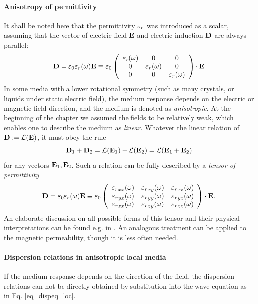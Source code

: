 \paragraph{Anisotropy of permittivity} \label{par_anisotropy} %
It shall be noted here that the permittivity $\varepsilon_r$ was introduced as a scalar, assuming that the vector of electric field $\mathbf{E}$ and electric induction $\mathbf{D}$ are always parallel:
\begin{equation} \mathbf{D} = \varepsilon_0 \varepsilon_r(\omega) \mathbf{E} \equiv \varepsilon_0  
	\left(\begin{array}{ccc} 
			\varepsilon_r(\omega) & 0 & 0  \\
			0 & \varepsilon_r(\omega) & 0  \\
			0 & 0 &\varepsilon_r(\omega)  
	\end{array} \right) \cdot \mathbf{E}
	\label{eq_ed_orientation}
\end{equation}
In some media with a lower rotational symmetry (such as many crystals, or liquids under static electric field), the medium response depends on the electric or magnetic field direction, and the medium is denoted as \textit{anisotropic}. At the beginning of the chapter we assumed the fields to be relatively weak, which enables one to describe the medium as \textit{linear}. Whatever the linear relation of $\mathbf{D} := \mathcal{L}(\mathbf{E})$, it must obey the rule
$$\mathbf{D}_1 + \mathbf{D}_2 = \mathcal{L}(\mathbf{E}_1) + \mathcal{L}(\mathbf{E}_2) = \mathcal{L}(\mathbf{E}_1 + \mathbf{E}_2)$$
for any vectors $\mathbf{E}_1, \mathbf{E}_2$. Such a relation can be fully described by a \textit{tensor of permittivity} 
\begin{equation} \mathbf{D} = \varepsilon_0 \varepsilon_r(\omega) \mathbf{E} \equiv \varepsilon_0  
	\left(\begin{array}{ccc} 
	{\varepsilon_r}_{xx}(\omega) & {\varepsilon_r}_{xy}(\omega) & {\varepsilon_r}_{xz}(\omega)  \\
	{\varepsilon_r}_{yx}(\omega) & {\varepsilon_r}_{yy}(\omega) & {\varepsilon_r}_{yz}(\omega)  \\
	{\varepsilon_r}_{zx}(\omega) & {\varepsilon_r}_{zy}(\omega) & {\varepsilon_r}_{zz}(\omega)  
	\end{array} \right) \cdot \mathbf{E}.
	\label{eq_epstensor}
\end{equation}
An elaborate discussion on all possible forms of this tensor and their physical interpretations can be found e.g. in \cite[pp. 678--686]{born1999book}. An analogous treatment can be applied to the magnetic permeability, though it is less often needed.

\paragraph{Dispersion relations in anisotropic local media}  %
If the medium response depends on the direction of the field, the dispersion relations can not be directly obtained by substitution into the wave equation as in Eq. \ref{eq_dispeq_loc}.

